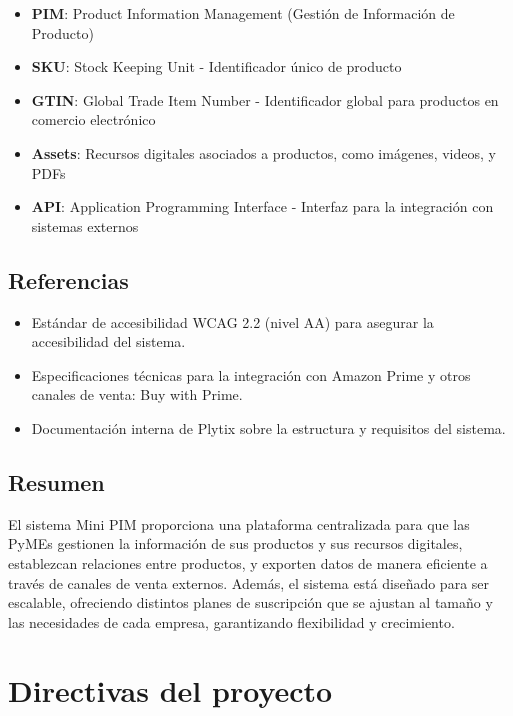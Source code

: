 \documentclass{article}
\begin{document}
\begin{itemize}
    \item \textbf{PIM}: Product Information Management (Gestión de Información de Producto)
    \item \textbf{SKU}: Stock Keeping Unit - Identificador único de producto
    \item \textbf{GTIN}: Global Trade Item Number - Identificador global para productos en comercio electrónico
    \item \textbf{Assets}: Recursos digitales asociados a productos, como imágenes, videos, y PDFs
    \item \textbf{API}: Application Programming Interface - Interfaz para la integración con sistemas externos
\end{itemize}

\subsection{Referencias}

\begin{itemize}
    \item Estándar de accesibilidad WCAG 2.2 (nivel AA) para asegurar la accesibilidad del sistema.
    \item Especificaciones técnicas para la integración con Amazon Prime y otros canales de venta: Buy with Prime.
    \item Documentación interna de Plytix sobre la estructura y requisitos del sistema.
\end{itemize}

\subsection{Resumen}

El sistema Mini PIM proporciona una plataforma centralizada para que las PyMEs gestionen la información de sus productos y sus recursos digitales, establezcan relaciones entre productos, y exporten datos de manera eficiente a través de canales de venta externos. Además, el sistema está diseñado para ser escalable, ofreciendo distintos planes de suscripción que se ajustan al tamaño y las necesidades de cada empresa, garantizando flexibilidad y crecimiento.

\section{Directivas del proyecto}
\end{document}
